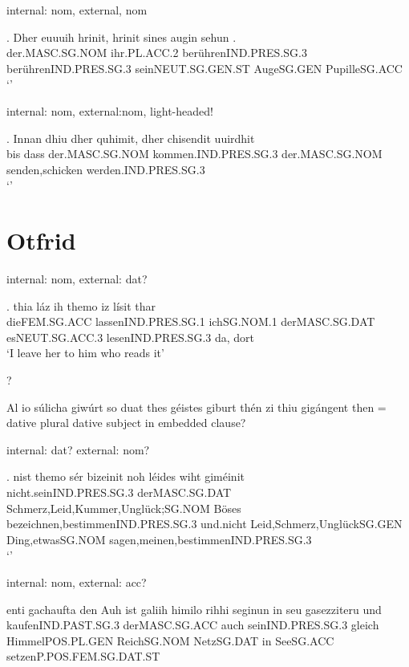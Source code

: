 
internal: nom, external, nom

\exg. Dher euuuih hrinit, hrinit sines augin sehun .\\
 der.MASC.SG.NOM ihr.PL.ACC.2 berührenIND.PRES.SG.3 berührenIND.PRES.SG.3 seinNEUT.SG.GEN.ST AugeSG.GEN PupilleSG.ACC\\
`' 


internal: nom, external:nom, light-headed!

\exg. Innan dhiu dher quhimit, dher chisendit uuirdhit\\
bis dass der.MASC.SG.NOM kommen.IND.PRES.SG.3  der.MASC.SG.NOM senden,schicken werden.IND.PRES.SG.3\\
`' 


\phantom{x}

\section{Otfrid}

internal: nom, external: dat?

\exg. thia	láz	ih	themo	iz	lísit	thar\\
dieFEM.SG.ACC	lassenIND.PRES.SG.1	ichSG.NOM.1	derMASC.SG.DAT	esNEUT.SG.ACC.3	lesenIND.PRES.SG.3	da, dort\\
`I leave her to him who reads it' 


?

Al	io	súlicha	giwúrt	so	duat	thes	géistes	giburt	thén	zi	thiu	gigángent
then = dative plural
dative subject in embedded clause?



internal: dat? external: nom?

\exg. nist	themo	sér	bizeinit	noh	léides	wiht	giméinit\\
nicht.seinIND.PRES.SG.3	derMASC.SG.DAT	Schmerz,Leid,Kummer,Unglück;SG.NOM Böses	bezeichnen,bestimmenIND.PRES.SG.3 und.nicht Leid,Schmerz,UnglückSG.GEN	Ding,etwasSG.NOM	sagen,meinen,bestimmenIND.PRES.SG.3\\
  `' 



internal: nom, external: acc?

 enti	gachaufta	den	Auh	ist	galiih	himilo	rihhi	seginun	in	seu	gasezziteru
 und	kaufenIND.PAST.SG.3		derMASC.SG.ACC		auch	seinIND.PRES.SG.3	gleich	HimmelPOS.PL.GEN	ReichSG.NOM		NetzSG.DAT		in	SeeSG.ACC		setzenP.POS.FEM.SG.DAT.ST

